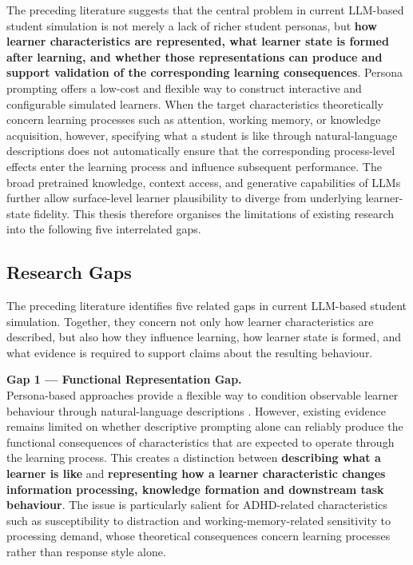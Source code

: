 The preceding literature suggests that the central problem in current LLM-based student simulation is not merely a lack of richer student personas, but \textbf{how learner characteristics are represented, what learner state is formed after learning, and whether those representations can produce and support validation of the corresponding learning consequences}. Persona prompting offers a low-cost and flexible way to construct interactive and configurable simulated learners. When the target characteristics theoretically concern learning processes such as attention, working memory, or knowledge acquisition, however, specifying what a student is like through natural-language descriptions does not automatically ensure that the corresponding process-level effects enter the learning process and influence subsequent performance. The broad pretrained knowledge, context access, and generative capabilities of LLMs further allow surface-level learner plausibility to diverge from underlying learner-state fidelity. This thesis therefore organises the limitations of existing research into the following five interrelated gaps.

\subsection{Research Gaps}

The preceding literature identifies five related gaps in current LLM-based student simulation. Together, they concern not only how learner characteristics are described, but also how they influence learning, how learner state is formed, and what evidence is required to support claims about the resulting behaviour.

\textbf{Gap 1 --- Functional Representation Gap.}\\
Persona-based approaches provide a flexible way to condition observable learner behaviour through natural-language descriptions \cite{benedetto-etal-2024-using,liu-etal-2024-personality}. However, existing evidence remains limited on whether descriptive prompting alone can reliably produce the functional consequences of characteristics that are expected to operate through the learning process. This creates a distinction between \textbf{describing what a learner is like} and \textbf{representing how a learner characteristic changes information processing, knowledge formation and downstream task behaviour}. The issue is particularly salient for ADHD-related characteristics such as susceptibility to distraction and working-memory-related sensitivity to processing demand, whose theoretical consequences concern learning processes rather than response style alone.

